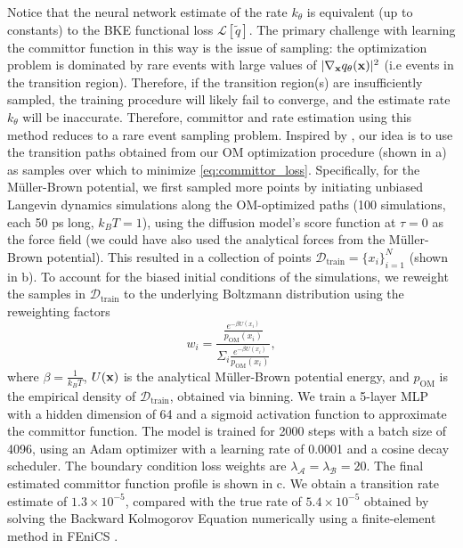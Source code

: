 Notice that the neural network estimate of the rate $k_\theta$ is equivalent (up to constants) to the BKE functional loss $\mathcal{L}[\widetilde{q}]$. The primary challenge with learning the committor function in this way is the issue of sampling: the optimization problem is dominated by rare events with large values of $|\nabla_{\mathbf{x}} q_\theta(\mathbf{x})|^2$ (i.e events in the transition region). Therefore, if the transition region(s) are insufficiently sampled, the training procedure will likely fail to converge, and the estimate rate $k_\theta$ will be inaccurate. Therefore, committor and rate estimation using this method reduces to a rare event sampling problem. Inspired by \citet{hasyim2022supervised}, our idea is to use the transition paths obtained from our OM optimization procedure (shown in a) as samples over which to minimize \eqref{eq:committor_loss}. Specifically, for the Müller-Brown potential, we first sampled more points by initiating unbiased Langevin dynamics simulations along the OM-optimized paths (100 simulations, each 50 ps long, $k_BT = 1$), using the diffusion model's score function at $\tau=0$ as the force field (we could have also used the analytical forces from the Müller-Brown potential). This resulted in a collection of points $\mathcal{D}_\text{train} = \{ x_i \}_{i=1}^N
$ (shown in b). To account for the biased initial conditions of the simulations, we reweight the samples in $\mathcal{D}_\text{train}$ to the underlying Boltzmann distribution using the reweighting factors 
\begin{equation}
    w_i = \frac{\frac{e^{-\beta U(x_i)}}{p_\text{OM}(x_i)}}{\Sigma_i \frac{e^{-\beta U(x_i)}}{p_\text{OM}(x_i)}},
\end{equation}
where $\beta = \frac{1}{k_BT}$, $U(\mathbf{x})$ is the analytical Müller-Brown potential energy, and $p_\text{OM}$ is the empirical density of $\mathcal{D}_\text{train}$, obtained via binning. We train a 5-layer MLP with a hidden dimension of 64 and a sigmoid activation function to approximate the committor function. The model is trained for 2000 steps with a batch size of 4096, using an Adam optimizer with a learning rate of 0.0001 and a cosine decay scheduler. The boundary condition loss weights are $\lambda_\mathcal{A} = \lambda_\mathcal{B} = 20$. The final estimated committor function profile is shown in c. We obtain a transition rate estimate of $1.3 \times 10^{-5}$, compared with the true rate of $5.4 \times 10^{-5}$ obtained by solving the Backward Kolmogorov Equation numerically using a finite-element method in FEniCS \cite{baratta2023dolfinx}. 

